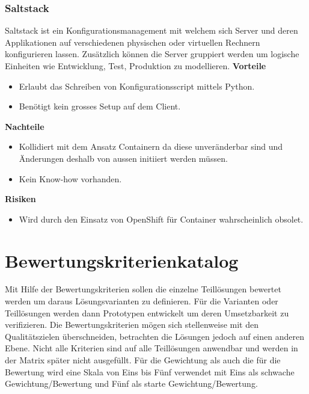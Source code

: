 \subsubsection{Saltstack}

Saltstack ist ein Konfigurationsmanagement mit welchem sich Server und deren Applikationen auf verschiedenen physischen oder virtuellen Rechnern konfigurieren lassen. Zusätzlich können die Server gruppiert werden um logische Einheiten wie Entwicklung, Test, Produktion zu modellieren.\newline
\newline
\textbf{Vorteile}
\begin{itemize}
	\item Erlaubt das Schreiben von Konfigurationsscript mittels Python.
	\item Benötigt kein grosses Setup auf dem Client.
\end{itemize}
\textbf{Nachteile}
\begin{itemize}
	\item Kollidiert mit dem Ansatz Containern da diese unveränderbar sind und Änderungen deshalb von aussen initiiert werden müssen.
	\item Kein Know-how vorhanden.
\end{itemize}
\textbf{Risiken}
\begin{itemize}
	\item Wird durch den Einsatz von OpenShift für Container wahrscheinlich obsolet.
\end{itemize}

\section{Bewertungskriterienkatalog}

Mit Hilfe der Bewertungskriterien sollen die einzelne Teillösungen bewertet werden um daraus Lösungsvarianten zu definieren. Für die Varianten oder Teillösungen werden dann Prototypen entwickelt um deren Umsetzbarkeit zu verifizieren. Die Bewertungskriterien mögen sich stellenweise mit den Qualitätszielen überschneiden, betrachten die Lösungen jedoch auf einen anderen Ebene. Nicht alle Kriterien sind auf alle Teillösungen anwendbar und werden in der Matrix später nicht ausgefüllt.\newline
Für die Gewichtung als auch die für die Bewertung wird eine Skala von Eins bis Fünf verwendet mit Eins als schwache Gewichtung/Bewertung und Fünf als starte Gewichtung/Bewertung.


